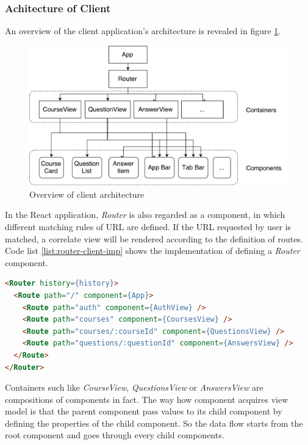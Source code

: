 \subsubsection{Achitecture of Client}

An overview of the client application's architecture is revealed in figure \ref{fig:client-arch-imp}. 

\begin{figure}[!htbp]
  \centering
    \includegraphics[width=1\textwidth]{Figures/imp-client-arch.pdf}
  \caption{Overview of client architecture}
  \label{fig:client-arch-imp}
\end{figure}

In the React application, \textit{Router} is also regarded  as a component, in which different matching rules of URL are defined. If the URL requested by user is matched, a correlate view will be rendered according to the definition of routes. Code list \ref{list:router-client-imp} shows the implementation of defining a \textit{Router} component.

\begin{lstlisting}[language=HTML, caption=Router in client app , label={list:router-client-imp}]
<Router history={history}>
  <Route path="/" component={App}>
    <Route path="auth" component={AuthView} />
    <Route path="courses" component={CoursesView} />
    <Route path="courses/:courseId" component={QuestionsView} />
    <Route path="questions/:questionId" component={AnswersView} />
  </Route>
</Router>
\end{lstlisting}

Containers such like \textit{CourseView}, \textit{QuestionsView} or \textit{AnswersView} are compositions of components in fact. The way how component acquires view model is that the parent component pass values to its child component by defining the properties of the child component. So the data flow starts from the root component and goes through every child components. 


